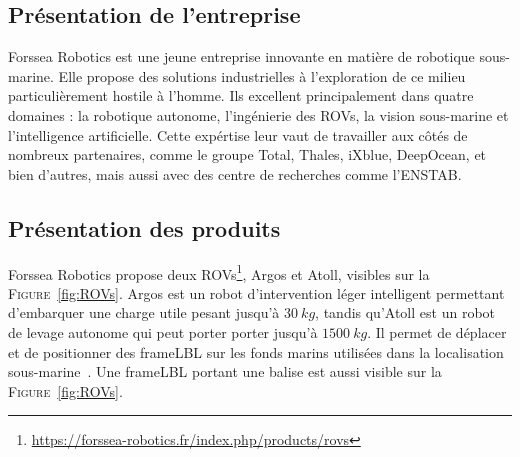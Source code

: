 \subsection{Présentation de l'entreprise}
    Forssea Robotics est une jeune entreprise innovante en matière de robotique sous-marine. Elle propose des solutions industrielles à l'exploration de ce milieu particulièrement hostile à l'homme. Ils excellent principalement dans quatre domaines : la robotique autonome, l'ingénierie des \gls{ROV}s, la vision sous-marine et l'intelligence artificielle. Cette expértise leur vaut de travailler aux côtés de nombreux partenaires, comme le groupe Total, Thales, iXblue, DeepOcean, et bien d'autres, mais aussi avec des centre de recherches comme l'\gls{ENSTAB}.

\subsection{Présentation des produits}
    Forssea Robotics propose deux \gls{ROV}s\footnote{\url{https://forssea-robotics.fr/index.php/products/rovs}}, \gls{Argos} et \gls{Atoll}, visibles sur la \textsc{Figure}~\ref{fig:ROVs}. \gls{Argos} est un robot d'intervention léger intelligent permettant d'embarquer une charge utile pesant jusqu'à $30\ kg$, tandis qu'\gls{Atoll} est un robot de levage autonome qui peut porter porter jusqu'à $1500\ kg$. Il permet de déplacer et de positionner des \gls{frameLBL} sur les fonds marins utilisées dans la localisation sous-marine~\cite{milne1983underwater}. Une \gls{frameLBL} portant une balise est aussi visible sur la \textsc{Figure}~\ref{fig:ROVs}.

